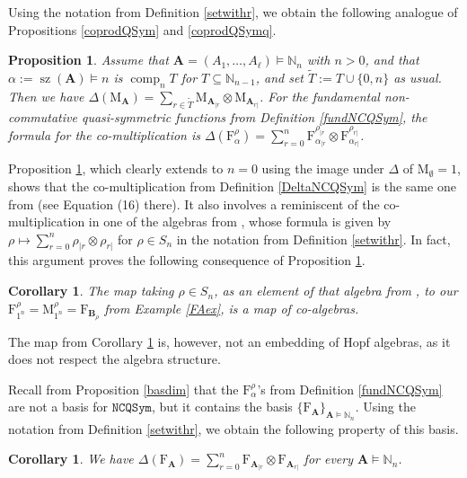 \documentclass{article}
\newtheorem{prop}[thm]{Proposition}
\newtheorem{cor}[thm]{Corollary}
\theoremstyle{definition}
\begin{document}
Using the notation from Definition \ref{setwithr}, we obtain the following analogue of Propositions \ref{coprodQSym} and \ref{coprodQSymq}.
\begin{prop}
Assume that $\mathbf{A}=(A_{1},\ldots,A_{\ell})\vDash\mathbb{N}_{n}$ with $n>0$, and that $\alpha:=\operatorname{sz}(\mathbf{A}) \vDash n$ is $\operatorname{comp}_{n}T$ for $T\subseteq\mathbb{N}_{n-1}$, and set $\tilde{T}:=T\cup\{0,n\}$ as usual. Then we have $\Delta(\mathrm{M}_{\mathbf{A}})=\sum_{r\in\tilde{T}}\mathrm{M}_{\mathbf{A}_{|r}}\otimes\mathrm{M}_{\mathbf{A}_{r|}}$. For the fundamental non-commutative quasi-symmetric functions from Definition \ref{fundNCQSym}, the formula for the co-multiplication is $\Delta(\mathrm{F}_{\alpha}^{\rho})=\sum_{r=0}^{n}\mathrm{F}_{\alpha_{|r}}^{\rho_{|r}}\otimes\mathrm{F}_{\alpha_{r|}}^{\rho_{r|}}$. \label{coprodNCQSym}
\end{prop}
Proposition \ref{coprodNCQSym}, which clearly extends to $n=0$ using the image under $\Delta$ of $\mathrm{M}_{\emptyset}=1$, shows that the co-multiplication from Definition \ref{DeltaNCQSym} is the same one from \cite{[BZ]} (see Equation (16) there). It also involves a reminiscent of the co-multiplication in one of the algebras from \cite{[MR]}, whose formula is given by $\rho\mapsto\sum_{r=0}^{n}\rho_{|r}\otimes\rho_{r|}$ for $\rho \in S_{n}$ in the notation from Definition \ref{setwithr}. In fact, this argument proves the following consequence of Proposition \ref{coprodNCQSym}.
\begin{cor}
The map taking $\rho \in S_{n}$, as an element of that algebra from \cite{[MR]}, to our $\mathrm{F}_{1^{n}}^{\rho}=\mathrm{M}_{1^{n}}^{\rho}=\mathrm{F}_{\mathbf{B}_{\rho}}$ from Example \ref{FAex}, is a map of co-algebras. \label{MRcoalg}
\end{cor}
The map from Corollary \ref{MRcoalg} is, however, not an embedding of Hopf algebras, as it does not respect the algebra structure.

Recall from Proposition \ref{basdim} that the $\mathrm{F}_{\alpha}^{\rho}$'s from Definition \ref{fundNCQSym} are not a basis for $\mathtt{NCQSym}$, but it contains the basis $\{\mathrm{F}_{\mathbf{A}}\}_{\mathbf{A}\vDash\mathbb{N}_{n}}$. Using the notation from Definition \ref{setwithr}, we obtain the following property of this basis.
\begin{cor}
We have $\Delta(\mathrm{F}_{\mathbf{A}})=\sum_{r=0}^{n}\mathrm{F}_{\mathbf{A}_{|r}}\otimes\mathrm{F}_{\mathbf{A}_{r|}}$ for every $\mathbf{A}\vDash\mathbb{N}_{n}$. \label{FADelta}
\end{cor}
\end{document}
